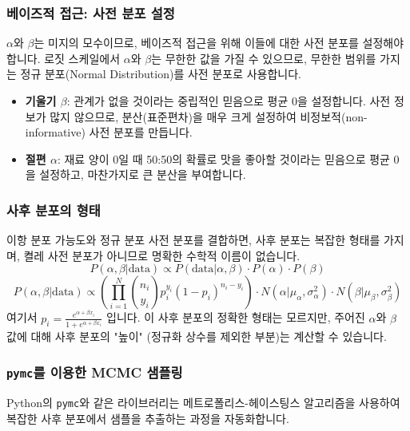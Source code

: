 \documentclass[11pt,a4paper]{article}
\theoremstyle{definition}
\begin{document}
\subsubsection*{베이즈적 접근: 사전 분포 설정}
$\alpha$와 $\beta$는 미지의 모수이므로, 베이즈적 접근을 위해 이들에 대한 사전 분포를 설정해야 합니다. 로짓 스케일에서 $\alpha$와 $\beta$는 무한한 값을 가질 수 있으므로, 무한한 범위를 가지는 정규 분포(Normal Distribution)를 사전 분포로 사용합니다.

\begin{infobox}[title=사전 분포 설정 예시]
\begin{itemize}
    \item \textbf{기울기 $\beta$}: 관계가 없을 것이라는 중립적인 믿음으로 평균 0을 설정합니다. 사전 정보가 많지 않으므로, 분산(표준편차)을 매우 크게 설정하여 비정보적(non-informative) 사전 분포를 만듭니다.
    \item \textbf{절편 $\alpha$}: 재료 양이 0일 때 50:50의 확률로 맛을 좋아할 것이라는 믿음으로 평균 0을 설정하고, 마찬가지로 큰 분산을 부여합니다.
\end{itemize}
\end{infobox}

\subsubsection*{사후 분포의 형태}
이항 분포 가능도와 정규 분포 사전 분포를 결합하면, 사후 분포는 복잡한 형태를 가지며, 켤레 사전 분포가 아니므로 명확한 수학적 이름이 없습니다.
\[ P(\alpha, \beta | \text{data}) \propto P(\text{data} | \alpha, \beta) \cdot P(\alpha) \cdot P(\beta) \]
\[ P(\alpha, \beta | \text{data}) \propto \left( \prod_{i=1}^{N} \binom{n_i}{y_i} p_i^{y_i} (1-p_i)^{n_i-y_i} \right) \cdot N(\alpha | \mu_\alpha, \sigma_\alpha^2) \cdot N(\beta | \mu_\beta, \sigma_\beta^2) \]
여기서 $p_i = \frac{e^{\alpha + \beta x_i}}{1 + e^{\alpha + \beta x_i}}$ 입니다.
이 사후 분포의 정확한 형태는 모르지만, 주어진 $\alpha$와 $\beta$ 값에 대해 사후 분포의 "높이" (정규화 상수를 제외한 부분)는 계산할 수 있습니다.

\subsubsection*{\texttt{pymc}를 이용한 MCMC 샘플링}
Python의 \texttt{pymc}와 같은 라이브러리는 메트로폴리스-헤이스팅스 알고리즘을 사용하여 복잡한 사후 분포에서 샘플을 추출하는 과정을 자동화합니다.
\end{document}
